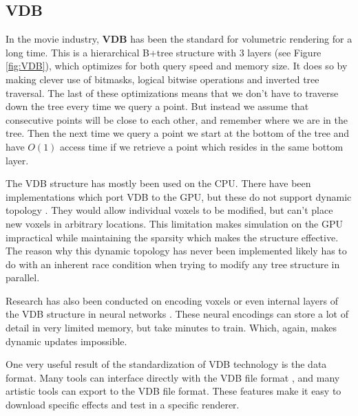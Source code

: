 \subsection{VDB}\label{INTRO:VDB}
In the movie industry, \textbf{VDB} \cite{museth2013vdb} has been the standard for volumetric rendering for a long time. This is a hierarchical B+tree structure with 3 layers (see Figure \ref{fig:VDB}), which optimizes for both query speed and memory size. It does so by making clever use of bitmasks, logical bitwise operations and inverted tree traversal. The last of these optimizations means that we don't have to traverse down the tree every time we query a point. But instead we assume that consecutive points will be close to each other, and remember where we are in the tree. Then the next time we query a point we start at the bottom of the tree and have $O(1)$ access time if we retrieve a point which resides in the same bottom layer. 

The VDB structure has mostly been used on the CPU. There have been implementations which port VDB to the GPU, but these do not support dynamic topology \cite{hoetzlein2016gvdb} \cite{museth2021nanovdb}. They would allow individual voxels to be modified, but can't place new voxels in arbitrary locations. This limitation makes simulation on the GPU impractical while maintaining the sparsity which makes the structure effective. The reason why this dynamic topology has never been implemented likely has to do with an inherent race condition when trying to modify any tree structure in parallel.

Research has also been conducted on encoding voxels or even internal layers of the VDB structure in neural networks \cite{kim2022neuralvdb}. These neural encodings can store a lot of detail in very limited memory, but take minutes to train. Which, again, makes dynamic updates impossible.

One very useful result of the standardization of VDB technology is the data format. Many tools can interface directly with the VDB file format \cite{VDBADeepDive}, and many artistic tools can export to the VDB file format. These features make it easy to download specific effects and test in a specific renderer.

